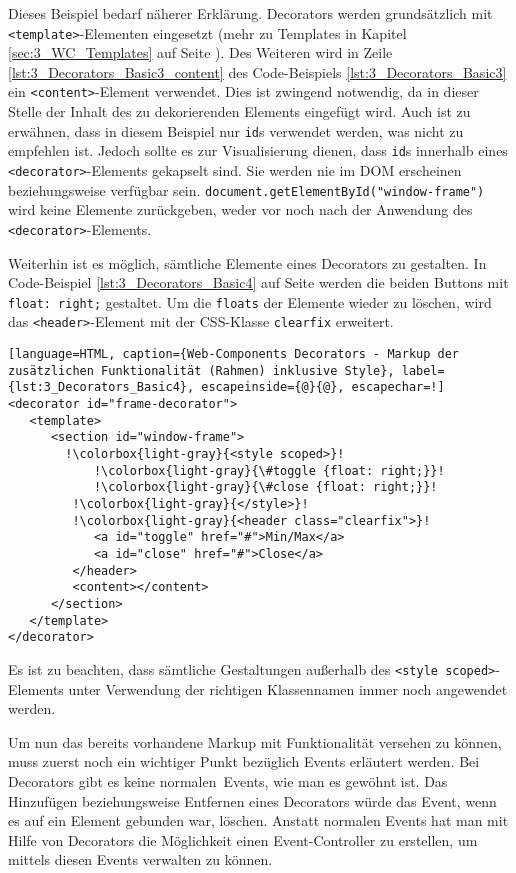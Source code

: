 Dieses Beispiel bedarf näherer Erklärung. Decorators werden grundsätzlich mit \lstinline|<template>|-Elementen eingesetzt (mehr zu Templates in Kapitel \ref{sec:3_WC_Templates} auf Seite \pageref{sec:3_WC_Templates}). Des Weiteren wird in Zeile \ref{lst:3_Decorators_Basic3_content} des Code-Beispiels \ref{lst:3_Decorators_Basic3} ein \lstinline|<content>|-Element verwendet. Dies ist zwingend notwendig, da in dieser Stelle der Inhalt des zu dekorierenden Elements eingefügt wird. Auch ist zu erwähnen, dass in diesem Beispiel nur \lstinline|id|s verwendet werden, was nicht zu empfehlen ist. Jedoch sollte es zur Visualisierung dienen, dass \lstinline|id|s innerhalb eines \lstinline|<decorator>|-Elements gekapselt sind. Sie werden nie im DOM erscheinen beziehungsweise verfügbar sein. \lstinline|document.getElementById("window-frame")| wird keine Elemente zurückgeben, weder vor noch nach der Anwendung des \lstinline|<decorator>|-Elements.

Weiterhin ist es möglich, sämtliche Elemente eines Decorators zu gestalten. In Code-Beispiel \ref{lst:3_Decorators_Basic4} auf Seite \pageref{lst:3_Decorators_Basic4} werden die beiden Buttons mit \lstinline|float: right;| gestaltet. Um die \lstinline|floats| der Elemente wieder zu löschen, wird das \lstinline|<header>|-Element mit der CSS-Klasse \lstinline|clearfix| erweitert.

\begin{lstlisting}[language=HTML, caption={Web-Components Decorators - Markup der zusätzlichen Funktionalität (Rahmen) inklusive Style}, label={lst:3_Decorators_Basic4}, escapeinside={@}{@}, escapechar=!]
<decorator id="frame-decorator">
   <template>
      <section id="window-frame">
        !\colorbox{light-gray}{<style scoped>}!
            !\colorbox{light-gray}{\#toggle {float: right;}}!
            !\colorbox{light-gray}{\#close {float: right;}}!
         !\colorbox{light-gray}{</style>}!
         !\colorbox{light-gray}{<header class="clearfix">}!
            <a id="toggle" href="#">Min/Max</a>
            <a id="close" href="#">Close</a>
         </header>
         <content></content>
      </section>
   </template>
</decorator>
\end{lstlisting}

Es ist zu beachten, dass sämtliche Gestaltungen außerhalb des \lstinline|<style scoped>|-Elements unter Verwendung der richtigen Klassennamen immer noch angewendet werden.

Um nun das bereits vorhandene Markup mit Funktionalität versehen zu können, muss zuerst noch ein wichtiger Punkt bezüglich Events erläutert werden. Bei Decorators gibt es keine \glqq normalen\grqq\ Events, wie man es gewöhnt ist. Das Hinzufügen beziehungsweise Entfernen eines Decorators würde das Event, wenn es auf ein Element gebunden war, löschen. Anstatt normalen Events hat man mit Hilfe von Decorators die Möglichkeit einen Event-Controller zu erstellen, um mittels diesen Events verwalten zu können.

